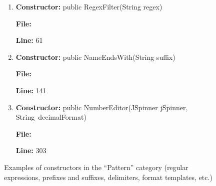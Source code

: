 \begin{figure}

\begin{enumerate}

\item
\textbf{Constructor:} public RegexFilter(String regex)

\textbf{File:} 

\textbf{Line:} 61

\vspace{6px}

\item
\textbf{Constructor:} public NameEndsWith(String suffix)

\textbf{File:} 

\textbf{Line:} 141

\vspace{6px}

\item
\textbf{Constructor:} public NumberEditor(JSpinner jSpinner, \mbox{String decimalFormat)}

\textbf{File:} 

\textbf{Line:} 303

%
%
%

\end{enumerate}

\vspace{-12px}

\caption{Examples of constructors in the ``Pattern'' category (regular expressions, prefixes and suffixes, delimiters, format templates, etc.)}
\label{pattern}
\end{figure}



